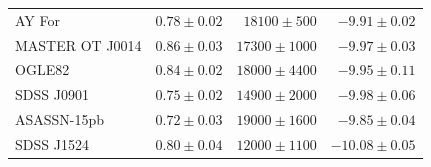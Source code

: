 \begin{table}
\begin{tabular}{lrrr}
        AY For          & $0.78 \pm 0.02$       & $18100 \pm  500$      & $ -9.91 \pm 0.02$ \\
        MASTER OT J0014 & $0.86 \pm 0.03$       & $17300 \pm 1000$      & $ -9.97 \pm 0.03$ \\
        OGLE82          & $0.84 \pm 0.02$       & $18000 \pm 4400$      & $ -9.95 \pm 0.11$ \\
        SDSS J0901      & $0.75 \pm 0.02$       & $14900 \pm 2000$      & $ -9.98 \pm 0.06$ \\
        ASASSN-15pb     & $0.72 \pm 0.03$       & $19000 \pm 1600$      & $ -9.85 \pm 0.04$ \\
        SDSS J1524      & $0.80 \pm 0.04$       & $12000 \pm 1100$      & $-10.08 \pm 0.05$ \\
        \hline
    \end{tabular}
\end{table}